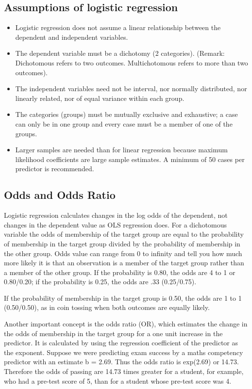 \documentclass[a4paper,12pt]{article}
\begin{document}
\subsection{Assumptions of logistic regression}
\begin{itemize}
\item Logistic regression does not assume a linear relationship between the dependent and
independent variables.
\item The dependent variable must be a dichotomy (2 categories).
(Remark: Dichotomous refers to two outcomes. Multichotomous refers to more than two outcomes).
\item The independent variables need not be interval, nor normally distributed, nor linearly
related, nor of equal variance within each group.
\item The categories (groups) must be mutually exclusive and exhaustive; a case can only be
in one group and every case must be a member of one of the groups.
\item Larger samples are needed than for linear regression because maximum likelihood
coefficients are large sample estimates. A minimum of 50 cases per predictor is
recommended.
\end{itemize}

\subsection{Odds and Odds Ratio}
Logistic regression calculates changes in the log odds of the dependent,
not changes in the dependent value as OLS regression does. For a dichotomous variable the
odds of membership of the target group are equal to the probability of membership in the
target group divided by the probability of membership in the other group. Odds value can
range from 0 to infinity and tell you how much more likely it is that an observation is a
member of the target group rather than a member of the other group. If the probability is
0.80, the odds are 4 to 1 or 0.80/0.20; if the probability is 0.25, the odds are .33 (0.25/0.75).

If the probability of membership in the target group is 0.50, the odds are 1 to 1 (0.50/0.50), as
in coin tossing when both outcomes are equally likely.

Another important concept is the odds ratio (OR), which estimates the change in the
odds of membership in the target group for a one unit increase in the predictor. It is calculated by using the regression coefficient of the predictor as the exponent. Suppose we were predicting exam success by a maths competency
predictor with an estimate b = 2.69. Thus the odds ratio is exp(2.69) or 14.73. Therefore the odds of passing
are 14.73 times greater for a student, for example, who had a pre-test score of 5, than for a
student whose pre-test score was 4.
\end{document}
